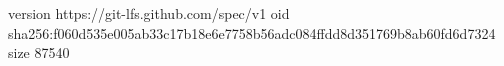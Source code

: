 version https://git-lfs.github.com/spec/v1
oid sha256:f060d535e005ab33c17b18e6e7758b56adc084ffdd8d351769b8ab60fd6d7324
size 87540
